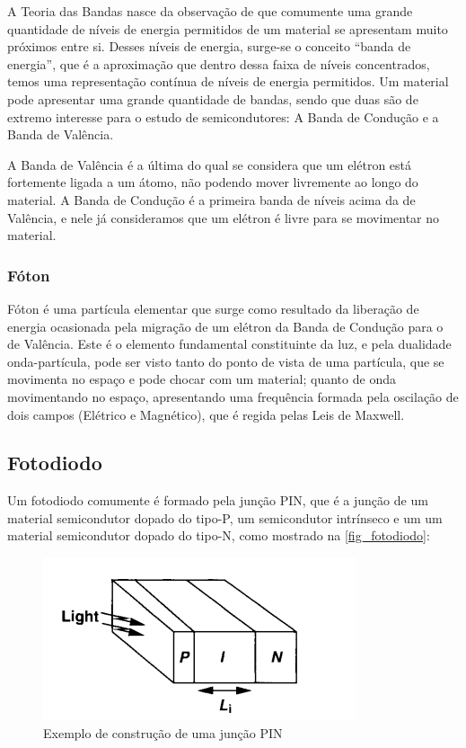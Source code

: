 A Teoria das Bandas nasce da observação de que comumente uma grande quantidade de níveis de energia permitidos de um material se apresentam muito próximos entre si. Desses níveis de energia, surge-se o conceito “banda de energia”, que \'e a aproximação que dentro dessa faixa de níveis concentrados, temos uma representação contínua de níveis de energia permitidos. Um material pode apresentar uma grande quantidade de bandas, sendo que duas são de extremo interesse para o estudo de semicondutores: A Banda de Condução e a Banda de Valência.

A Banda de Valência \'e a última do qual se considera que um el\'etron está fortemente ligada a um átomo, não podendo mover livremente ao longo do material. A Banda de Condução \'e a primeira banda de níveis acima da de Valência, e nele já consideramos que um el\'etron \'e livre para se movimentar no material.

\subsubsection{Fóton}

Fóton \'e uma partícula elementar que surge como resultado da liberação de energia ocasionada pela migração de um el\'etron da Banda de Condução para o de Valência. Este \'e o elemento fundamental constituinte da luz, e pela dualidade onda-partícula, pode ser visto tanto do ponto de vista de uma partícula, que se movimenta no espaço e pode chocar com um material; quanto de onda movimentando no espaço, apresentando uma frequência formada pela oscilação de dois campos (El\'etrico e Magn\'etico), que \'e regida pelas Leis de Maxwell.

\subsection{Fotodiodo}
\label{secao_fotodiodo}
Um fotodiodo comumente \'e formado pela junção PIN, que \'e a junção de um material semicondutor dopado do tipo-P, um semicondutor intrínseco e um um material semicondutor dopado do tipo-N, como mostrado na \autoref{fig_fotodiodo}:

\begin{figure}[htb]
	\caption{\label{fig_fotodiodo}Exemplo de construção de uma junção PIN}
	\begin{center}
	    \includegraphics[scale=0.5]{Imagens/PIN.png}
	\end{center}
\end{figure}

